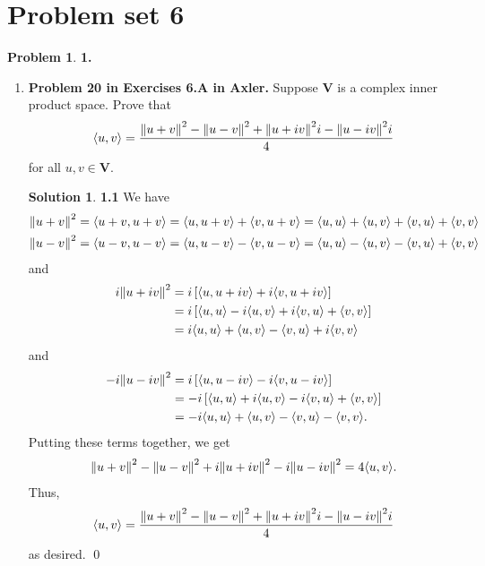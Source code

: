\documentclass{book}
\theoremstyle{definition}
\newtheorem*{prob*}{Problem}
\newtheorem*{sln*}{Solution}
\newcommand{\V}{\mathbf{V}}
\newcommand{\la}{\langle}
\newcommand{\ra}{\rangle}
\begin{document}
\newpage


\section{Problem set 6}


\begin{prob*}\textbf{1.} \\
	\begin{enumerate}
		\item \textbf{Problem 20 in Exercises 6.A in Axler.} Suppose $\V$ is a complex inner product space. Prove that
		\begin{align*}
		\la u ,v \ra = \frac{\norm{u+ v}^2  - \norm{u-v}^2 + \norm{u + iv}^2i - \norm{u - iv}^2i   }{4} 
		\end{align*}
		for all $u,v \in \V$.
		
		\begin{sln*}\textbf{1.1} 
			We have
			\begin{align*}
			&\norm{u+v}^2 = \la u+v, u+v \ra = \la u,u+v \ra + \la v,u+v \ra = \la u,u\ra + \la u,v \ra + \la v,u \ra + \la v,v \ra\\
			&\norm{u-v}^2 = \la u-v, u-v \ra = \la u,u-v \ra - \la v,u-v \ra = \la u,u\ra - \la u,v \ra - \la v,u \ra + \la v,v \ra
			\end{align*}
			and
			\begin{align*}
			i\norm{u+iv}^2 &= i \left[ \la u,u+iv \ra + i\la v,u+iv\ra \right]\\
			&= i \left[ \la u,u \ra -i\la u,v \ra + i\la v,u\ra + \la v,v \ra \right]\\
			&= i\la u,u \ra + \la u,v \ra - \la v,u\ra + i\la v,v\ra
			\end{align*}
			and
			\begin{align*}
			-i\norm{u-iv}^2 &= i \left[ \la u,u-iv \ra - i\la v,u-iv\ra \right]\\
			&= -i \left[ \la u,u \ra +i\la u,v \ra - i\la v,u\ra + \la v,v \ra \right]\\
			&= -i\la u,u \ra + \la u,v \ra - \la v,u\ra - \la v,v\ra.
			\end{align*}
			Putting these terms together, we get
			\begin{align*}
			\norm{u+v}^2  -\norm{u-v}^2 + i\norm{u+iv}^2 -i\norm{u-iv}^2 = 4\la u,v \ra.
			\end{align*}
			Thus, 
			\begin{align*}
			\la u ,v \ra = \frac{\norm{u+ v}^2  - \norm{u-v}^2 + \norm{u + iv}^2i - \norm{u - iv}^2i   }{4}
			\end{align*}
			as desired. \qed
		\end{sln*}
		

\end{enumerate}
\end{prob*}
\end{document}
